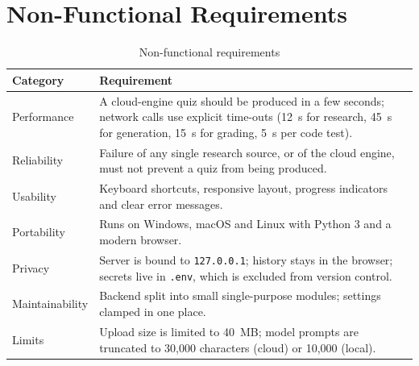 \section{Non-Functional Requirements}
\begin{table}[H]
\centering
\begin{tabularx}{\textwidth}{@{} p{3cm} X @{}}
\toprule
\textbf{Category} & \textbf{Requirement} \\
\midrule
Performance & A cloud-engine quiz should be produced in a few seconds; network calls use explicit time-outs (12~s for research, 45~s for generation, 15~s for grading, 5~s per code test). \\
Reliability & Failure of any single research source, or of the cloud engine, must not prevent a quiz from being produced. \\
Usability & Keyboard shortcuts, responsive layout, progress indicators and clear error messages. \\
Portability & Runs on Windows, macOS and Linux with Python 3 and a modern browser. \\
Privacy & Server is bound to \texttt{127.0.0.1}; history stays in the browser; secrets live in \texttt{.env}, which is excluded from version control. \\
Maintainability & Backend split into small single-purpose modules; settings clamped in one place. \\
Limits & Upload size is limited to 40~MB; model prompts are truncated to 30{,}000 characters (cloud) or 10{,}000 (local). \\
\bottomrule
\end{tabularx}
\caption{Non-functional requirements}
\label{tab:nfr}
\end{table}
